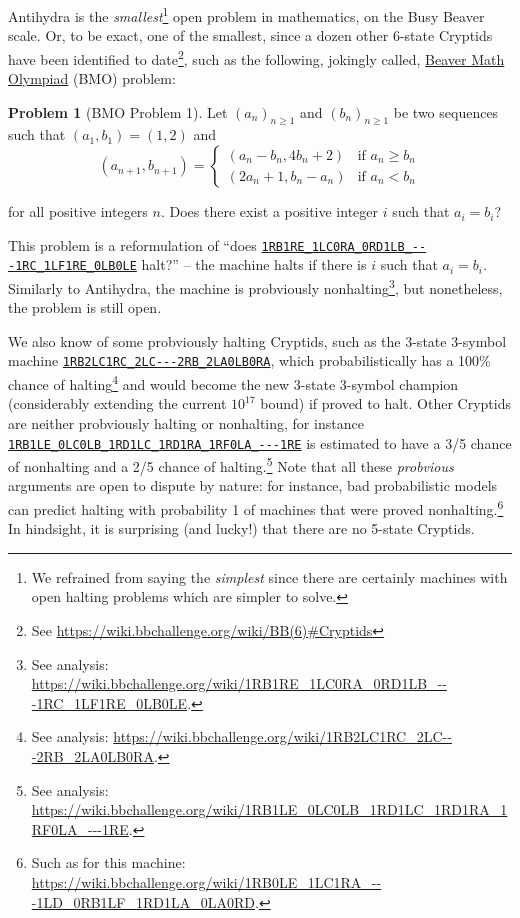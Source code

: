 \documentclass[a4paper,british]{article}
\theoremstyle{definition} %
\newtheorem{problem}{Problem}[section]
\numberwithin{equation}{section}
\theoremstyle{definition} %
\newcommand{\tm}[1]{\href{https://bbchallenge.org/#1}{\texttt{\nolinkurl{#1}}}}
\begin{document}
Antihydra is the \textit{smallest}\footnote{We refrained from saying the \textit{simplest} since there are certainly machines with open halting problems which are simpler to solve.} open problem in mathematics, on the Busy Beaver scale. Or, to be exact, one of the smallest, since a dozen other 6-state Cryptids have been identified to date\footnote{See \url{https://wiki.bbchallenge.org/wiki/BB(6)\#Cryptids}}, such as the following, jokingly called, \href{https://wiki.bbchallenge.org/wiki/Beaver_Math_Olympiad}{Beaver Math Olympiad} (BMO) problem:

\begin{problem}[BMO Problem 1]
Let $(a_n)_{n \ge 1}$ and $(b_n)_{n \ge 1}$ be two sequences such that $(a_1, b_1) = (1, 2)$ and
$$(a_{n+1}, b_{n+1}) = \begin{cases}
        (a_n-b_n, 4b_n+2) & \text{if }a_n \ge b_n \\
        (2a_n+1, b_n-a_n) & \text{if }a_n < b_n
    \end{cases}$$

\noindent for all positive integers $n$. Does there exist a positive integer $i$ such that $a_i = b_i$?
\end{problem}

This problem is a reformulation of  ``does \tm{1RB1RE_1LC0RA_0RD1LB_---1RC_1LF1RE_0LB0LE} halt?'' -- the machine halts if there is $i$ such that $a_i = b_i$. Similarly to Antihydra, the machine is probviously nonhalting\footnote{See analysis: {\scriptsize \url{https://wiki.bbchallenge.org/wiki/1RB1RE_1LC0RA_0RD1LB_---1RC_1LF1RE_0LB0LE}}. }, but nonetheless, the problem is still open.

We also know of some probviously halting Cryptids, such as the 3-state 3-symbol machine \tm{1RB2LC1RC_2LC---2RB_2LA0LB0RA}, which probabilistically  has a 100\% chance of halting\footnote{See analysis: {\scriptsize \url{https://wiki.bbchallenge.org/wiki/1RB2LC1RC_2LC---2RB_2LA0LB0RA}}.} and would become the new 3-state 3-symbol champion (considerably extending the current $10^{17}$ bound) if proved to halt. Other Cryptids are neither probviously halting or nonhalting, for instance \tm{1RB1LE_0LC0LB_1RD1LC_1RD1RA_1RF0LA_---1RE} is estimated to have a 3/5 chance of nonhalting and a 2/5 chance of halting.\footnote{See analysis: {\scriptsize \url{https://wiki.bbchallenge.org/wiki/1RB1LE_0LC0LB_1RD1LC_1RD1RA_1RF0LA_---1RE}}.} Note that all these \textit{probvious} arguments are open to dispute by nature: for instance, bad probabilistic models can predict halting with probability 1 of machines that were proved nonhalting.\footnote{Such as for this machine: \url{https://wiki.bbchallenge.org/wiki/1RB0LE_1LC1RA_---1LD_0RB1LF_1RD1LA_0LA0RD}.} In hindsight, it is surprising (and lucky!) that there are no 5-state Cryptids.
\end{document}
